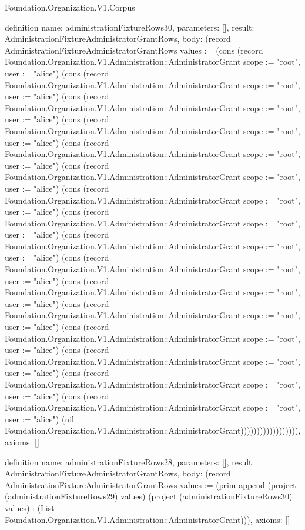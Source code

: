 \begin{lexlean}{Foundation.Organization.V1.Corpus}
\begin{semanticmodule}
definition{
  name: administrationFixtureRows30,
  parameters: [],
  result: AdministrationFixtureAdministratorGrantRows,
  body: (record AdministrationFixtureAdministratorGrantRows {values := (cons (record Foundation.Organization.V1.Administration::AdministratorGrant {scope := "root", user := "alice"}) (cons (record Foundation.Organization.V1.Administration::AdministratorGrant {scope := "root", user := "alice"}) (cons (record Foundation.Organization.V1.Administration::AdministratorGrant {scope := "root", user := "alice"}) (cons (record Foundation.Organization.V1.Administration::AdministratorGrant {scope := "root", user := "alice"}) (cons (record Foundation.Organization.V1.Administration::AdministratorGrant {scope := "root", user := "alice"}) (cons (record Foundation.Organization.V1.Administration::AdministratorGrant {scope := "root", user := "alice"}) (cons (record Foundation.Organization.V1.Administration::AdministratorGrant {scope := "root", user := "alice"}) (cons (record Foundation.Organization.V1.Administration::AdministratorGrant {scope := "root", user := "alice"}) (cons (record Foundation.Organization.V1.Administration::AdministratorGrant {scope := "root", user := "alice"}) (cons (record Foundation.Organization.V1.Administration::AdministratorGrant {scope := "root", user := "alice"}) (cons (record Foundation.Organization.V1.Administration::AdministratorGrant {scope := "root", user := "alice"}) (cons (record Foundation.Organization.V1.Administration::AdministratorGrant {scope := "root", user := "alice"}) (cons (record Foundation.Organization.V1.Administration::AdministratorGrant {scope := "root", user := "alice"}) (cons (record Foundation.Organization.V1.Administration::AdministratorGrant {scope := "root", user := "alice"}) (cons (record Foundation.Organization.V1.Administration::AdministratorGrant {scope := "root", user := "alice"}) (cons (record Foundation.Organization.V1.Administration::AdministratorGrant {scope := "root", user := "alice"}) (nil Foundation.Organization.V1.Administration::AdministratorGrant)))))))))))))))))}),
  axioms: []
}

definition{
  name: administrationFixtureRows28,
  parameters: [],
  result: AdministrationFixtureAdministratorGrantRows,
  body: (record AdministrationFixtureAdministratorGrantRows {values := (prim append (project (administrationFixtureRows29) values) (project (administrationFixtureRows30) values) : (List Foundation.Organization.V1.Administration::AdministratorGrant))}),
  axioms: []
}


\end{semanticmodule}
\end{lexlean}
